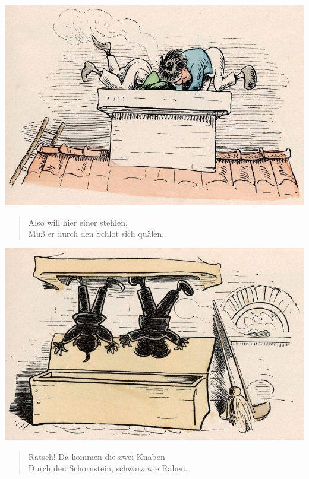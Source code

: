 \documentclass[a4paper,12pt]{article}
\begin{document}
\begin{center}\includegraphics[scale=.7, alt={Durch den Schlot}]{images/6-02.jpg}\end{center}



\begin{verse}
Also will hier einer stehlen,\\{}
Muß er durch den Schlot sich quälen.
\end{verse}



\begin{center}\includegraphics[scale=.7, alt={Schwarz wie Raben}]{images/6-03.jpg}\end{center}



\begin{verse}
Ratsch! Da kommen die zwei Knaben\\{}
Durch den Schornstein, schwarz wie Raben.
\end{verse}
\end{document}
